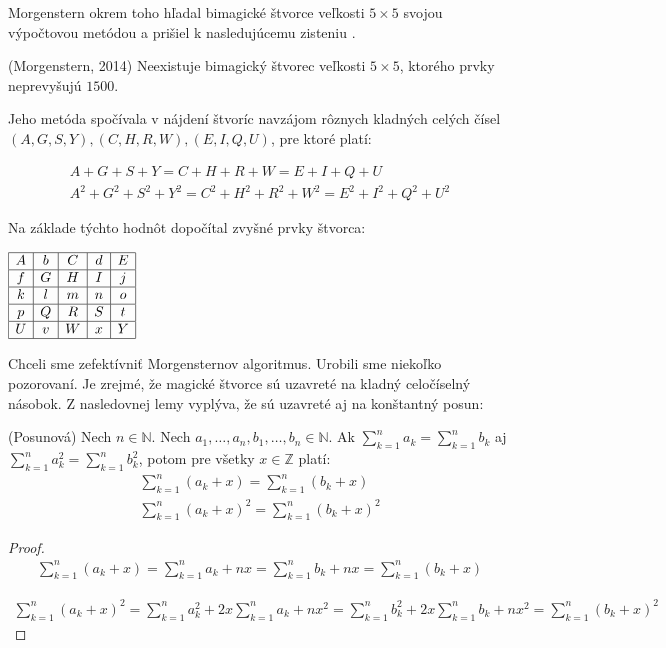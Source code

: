 Morgenstern okrem toho hľadal bimagické štvorce veľkosti $5 \times 5$ svojou výpočtovou metódou a prišiel k nasledujúcemu zisteniu \cite{multimagie}.

\begin{theorem} (Morgenstern, 2014) Neexistuje bimagický štvorec veľkosti $5 \times 5$, ktorého prvky neprevyšujú $1500$.
\end{theorem}

Jeho metóda spočívala v nájdení štvoríc navzájom rôznych kladných celých čísel $(A,G,S,Y), (C,H,R,W), (E,I,Q,U)$, pre ktoré platí:

\begin{gather*}
A+G+S+Y = C+H+R+W = E+I+Q+U \\
A^2+G^2+S^2+Y^2 = C^2+H^2+R^2+W^2 = E^2+I^2+Q^2+U^2
\end{gather*}

Na základe týchto hodnôt dopočítal zvyšné prvky štvorca:

\begin{center}
$\begin{array}{ |c|c|c|c|c| }
\hline
A & b & C & d & E \\ 
\hline
f & G & H & I & j  \\ 
\hline
k & l & m & n & o \\ 
\hline
p & Q & R & S & t \\ 
\hline
U & v & W & x & Y \\
\hline
\end{array}$
\end{center}

Chceli sme zefektívniť Morgensternov algoritmus. Urobili sme niekoľko pozorovaní. Je zrejmé, že magické štvorce sú uzavreté na kladný celočíselný násobok. Z nasledovnej lemy vyplýva, že sú uzavreté aj na konštantný posun:

\begin{lemma} (Posunová) Nech $n \in \mathbb{N}$. Nech $a_1, \dots , a_n, b_1, \dots , b_n \in \mathbb{N}$. Ak $\sum_{k=1}^{n} a_k = \sum_{k=1}^{n} b_k$ aj $\sum_{k=1}^{n} a^2_k = \sum_{k=1}^{n} b^2_k$, potom pre všetky $x \in \mathbb{Z}$ platí:
\begin{gather*}
\sum_{k=1}^{n} (a_k + x) = \sum_{k=1}^{n} (b_k + x) \\
\sum_{k=1}^{n} (a_k + x)^2 = \sum_{k=1}^{n} (b_k + x)^2
\end{gather*}
\end{lemma}
 
\begin{proof}
\begin{gather*}
\sum_{k=1}^{n} (a_k + x) = \sum_{k=1}^{n} a_k + nx = \sum_{k=1}^{n} b_k + nx = \sum_{k=1}^{n} (b_k + x)
\end{gather*}

\begin{gather*}
\sum_{k=1}^{n} (a_k + x)^2 = \sum_{k=1}^{n} a^2_k + 2x \sum_{k=1}^{n} a_k + nx^2 = \sum_{k=1}^{n} b^2_k + 2x \sum_{k=1}^{n} b_k + nx^2 = \sum_{k=1}^{n} (b_k + x)^2
\end{gather*}
\end{proof}

